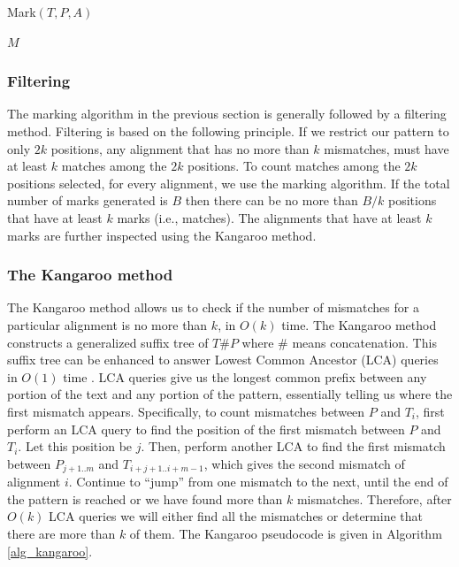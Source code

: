 \begin{algorithm}
\caption{Mark$(T, P, A)$}\label{alg_counting} 
\Return $M$\;
\end{algorithm}

\subsubsection{Filtering}
The marking algorithm in the previous section is generally followed by a
filtering method. Filtering is based on the following principle. If we restrict
our pattern to only $2k$ positions, any alignment that has no more than
$k$ mismatches, must have at least $k$ matches among the $2k$ positions.
To count matches among the $2k$ positions selected, for every alignment, we use
the marking algorithm. If the total number of marks generated is $B$ then there
can be no more than $B/k$ positions that have at least $k$ marks (i.e.,
matches). The alignments that have at least
$k$ marks are further inspected using the Kangaroo method.

\subsubsection{The Kangaroo method}\label{sec_kangaroo} 

The Kangaroo method allows us to check if the number of mismatches for a
particular alignment is no more than $k$, in $O(k)$ time. The Kangaroo method
constructs a generalized suffix tree of $T\#P$ where $\#$ means concatenation.
This suffix tree can be enhanced to answer Lowest Common Ancestor
(LCA) queries in $O(1)$ time \cite{AH+76}. LCA queries give us the longest
common prefix between any portion of the text and any portion of the pattern,
essentially telling us where the first mismatch appears. 
Specifically, to count mismatches between
$P$ and $T_i$, first perform an LCA query to find the position of the
first mismatch between $P$ and $T_i$. Let this position be $j$. Then,
perform another LCA to find the first mismatch between $P_{j+1..m}$ and
$T_{i+j+1.. i+m-1}$, which gives the second mismatch of alignment $i$.
Continue to ``jump'' from one mismatch to the next, until the end
of the pattern is reached or we have found more than $k$ mismatches.
Therefore, after $O(k)$ LCA queries we will either find all the mismatches or
determine that there are more than $k$ of them. 
The Kangaroo pseudocode is given in Algorithm \ref{alg_kangaroo}.

